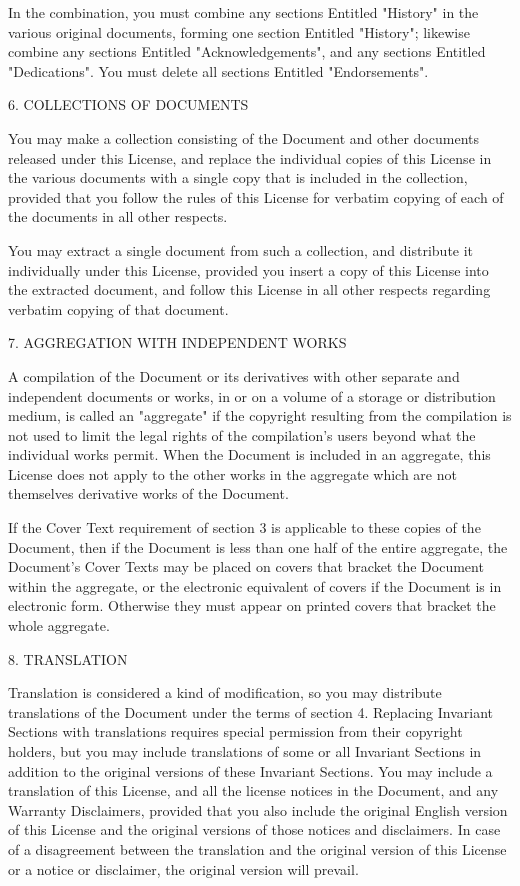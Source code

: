 \documentclass[a4paper,11pt]{report}
\begin{document}
{ In the combination, you must combine any sections Entitled "History" in the
various original documents, forming one section Entitled "History"; likewise
combine any sections Entitled "Acknowledgements", and any sections Entitled
"Dedications". You must delete all sections Entitled "Endorsements". 

 6. COLLECTIONS OF DOCUMENTS 

 You may make a collection consisting of the Document and other documents
released under this License, and replace the individual copies of this License
in the various documents with a single copy that is included in the
collection, provided that you follow the rules of this License for verbatim
copying of each of the documents in all other respects. 

 You may extract a single document from such a collection, and distribute it
individually under this License, provided you insert a copy of this License
into the extracted document, and follow this License in all other respects
regarding verbatim copying of that document. 

 7. AGGREGATION WITH INDEPENDENT WORKS 

 A compilation of the Document or its derivatives with other separate and
independent documents or works, in or on a volume of a storage or distribution
medium, is called an "aggregate" if the copyright resulting from the
compilation is not used to limit the legal rights of the compilation's users
beyond what the individual works permit. When the Document is included in an
aggregate, this License does not apply to the other works in the aggregate
which are not themselves derivative works of the Document. 

 If the Cover Text requirement of section 3 is applicable to these copies of
the Document, then if the Document is less than one half of the entire
aggregate, the Document's Cover Texts may be placed on covers that bracket the
Document within the aggregate, or the electronic equivalent of covers if the
Document is in electronic form. Otherwise they must appear on printed covers
that bracket the whole aggregate. 

 8. TRANSLATION 

 Translation is considered a kind of modification, so you may distribute
translations of the Document under the terms of section 4. Replacing Invariant
Sections with translations requires special permission from their copyright
holders, but you may include translations of some or all Invariant Sections in
addition to the original versions of these Invariant Sections. You may include
a translation of this License, and all the license notices in the Document,
and any Warranty Disclaimers, provided that you also include the original
English version of this License and the original versions of those notices and
disclaimers. In case of a disagreement between the translation and the
original version of this License or a notice or disclaimer, the original
version will prevail. 

}
\end{document}
